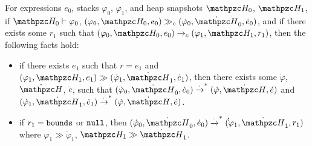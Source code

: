 \begin{thm}\label{simulation-thm}
For \lang expressions $e_0$, stacks $\varphi_0$, $\varphi_1$, and heap snapshots $\heap_0$, $\heap_1$, 
if $\heap_0 \vdash \varphi_0$, $(\varphi_0,\heap_0,e_0)\gg_c (\dot \varphi_0,\dot \heap_0, \dot e_0)$,
and if there exists some $r_1$ such that $(\varphi_0, \heap_0, e_0)
\rightarrow_c (\varphi_1, \heap_1, r_1)$, then the following facts hold:

\begin{itemize}

\item if there exists $e_1$ such that $r=e_1$ and $(\varphi_1, \heap_1, e_1) \gg (\dot \varphi_1, \dot \heap_1, \dot e_1)$, then there exists some $\dot \varphi$,$\dot \heap$, $\dot e$, such that
$(\dot \varphi_0, \dot \heap_0,\dot e_0) \xrightarrow{\cdot}^* (\dot
\varphi,\dot \heap,\dot e)$ and $(\dot
\varphi_1,\dot \heap_1,\dot e_1) \xrightarrow{\cdot}^* (\dot \varphi,
\dot \heap,\dot e)$.

\item if $r_1 = \mathtt{bounds}$ or $\mathtt{null}$, then $(\dot \varphi_0, \dot \heap_0,\dot e_0) \xrightarrow{\cdot}^* (\dot
\dot \varphi_1,\dot \heap_1, r_1)$ where $\varphi_1 \gg \dot
\varphi_1$, $\heap_1 \gg \dot \heap_1$.

\end{itemize}
\end{thm}




